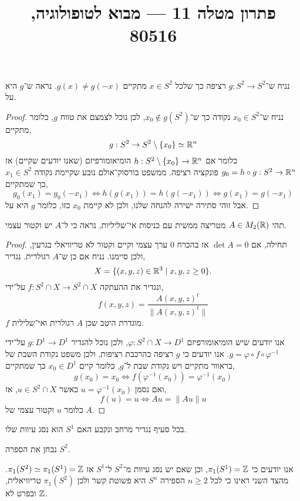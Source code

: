 
\title{פתרון מטלה 11 --- מבוא לטופולוגיה, 80516}

\usepackage{pgfplots}
\pgfplotsset{width=7cm,compat=1.18}


\maketitle
\maketitleprint[purple]

\question{}
נניח ש־$g : S^2 \to S^2$ רציפה כך שלכל $x \in S^2$ מתקיים $g(x) \ne g(-x)$.
נראה ש־$g$ היא על.
\begin{proof}
	נניח ש־$x_0 \in S^2$ נקודה כך ש־$x_0 \notin g(S^2)$, לכן נוכל לצמצם את טווח $g$, כלומר מתקיים,
	\[
		g : S^2 \to S^2 \setminus \{ x_0 \}
		\simeq \mathbb{R}^n
	\]
	כלומר אם $h : S^2 \setminus \{ x_0 \} \to \mathbb{R}^n$ הומיאומורפיזם (שאנו יודעים שקיים) אז $g_0 = h \circ g : S^2 \to \mathbb{R}^n$ פונקציה רציפה.
	ממשפט בורסוק־אולם נובע שקיימת נקודה $x_1 \in S^2$ כך שמתקיים,
	\[
		g_0(x_1) = g_0(-x_1)
		\iff h(g(x_1)) = h(g(-x_1))
		\iff g(x_1) = g(-x_1)
	\]
	אבל זוהי סתירה ישירה להנחה שלנו, ולכן לא קיימת $x_0$ כזו, כלומר $g$ היא על.
\end{proof}

\question{}
תהי $A \in M_2(\mathbb{R})$ מטריצה ממשית עם כניסות אי־שליליות,
נראה כי ל־$A$ יש וקטור עצמי.
\begin{proof}
	תחילה, אם $\det A = 0$ אז בהכרח $0$ ערך עצמי וקיים וקטור לא טריוויאלי בגרעין, ולכן סיימנו.
	נניח אם כן ש־$A$ רגולרית.
	נגדיר,
	\[
		X = \{ (x, y, z) \in \mathbb{R}^3 \mid x, y, z \ge 0 \}
	.\]
	ונגדיר את ההעתקה $f : S^2 \cap X \to S^2 \cap X$ על־ידי,
	\[
		f(x, y, z)
		= \frac{A {(x, y, z)}^t}{\lVert A {(x, y, z)}^t \rVert}
	\]
	$f$ מוגדרת היטב שכן $A$ רגולרית ואי־שלילית.

	אנו יודעים שיש הומיאומורפיזם $\varphi : S^2 \cap X \to D^1$, ולכן נוכל להגדיר $g : D^1 \to D^1$ על־ידי $g = \varphi \circ f \circ \varphi^{-1}$.
	אנו יודעים כי $g$ רציפה כהרכבת רציפות, ולכן משפט נקודת השבת של בראוור מתקיים ויש נקודת שבת ל־$g$, כלומר קיים $x_0 \in D^1$ כך שמתקיים,
	\[
		g(x_0) = x_0
		\iff f(\varphi^{-1}(x_0)) = \varphi^{-1}(x_0)
	\]
	ואם נסמן $u = \varphi^{-1}(x_0)$ כאשר $u \in S^2 \cap X$, אז,
	\[
		f(u) = u
		\iff A u = \lVert A u \rVert u
	\]
	כלומר $u$ וקטור עצמי של $A$.
\end{proof}

\question{}
בכל סעיף נגדיר מרחב ונקבע האם $S^1$ הוא נסג עיוות שלו.

\subquestion{}
נבחן את הספרה $S^2$.
\begin{solution}
	אנו יודעים כי $\pi_1(S^1) = \mathbb{Z}$, וכן שאם יש נסג עיוות מ־$S^2$ ל־$S^1$ אז $\pi_1(S^2) \simeq \pi_1(S^1) = \mathbb{Z}$.
	מהצד השני ראינו כי לכל $n \ge 2$ הספירה $S^n$ היא פשוטת קשר ולכן $\pi_1(S^2)$ טריוויאלית, ובפרט לא $\mathbb{Z}$.
\end{solution}


